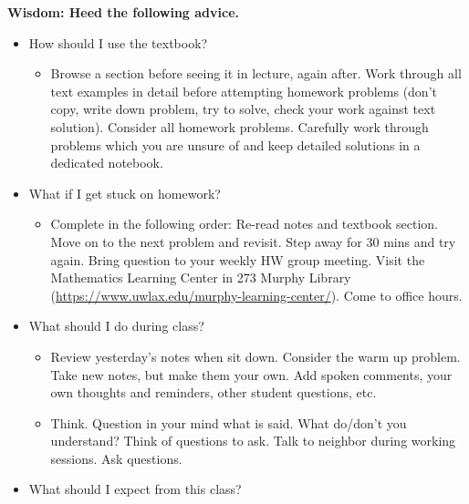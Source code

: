 \documentclass [11pt]{article}
\begin{document}
\bfseries Wisdom: \normalfont Heed the following advice.  \begin{itemize}
\setlength{\itemsep}{1pt}
\setlength{\parskip}{0pt}
\setlength{\parsep}{0pt}
\item How should I use the textbook?  \vspace{-1mm}
\begin {itemize}
\setlength{\itemsep}{1pt}
\setlength{\parskip}{0pt}
\setlength{\parsep}{0pt}
\item Browse a section before seeing it in lecture, again after. Work through all text examples in detail before attempting homework problems (don't copy, write down problem, try to solve, check your work against text solution). Consider all homework problems. Carefully work through problems which you are unsure of and keep detailed solutions in a dedicated notebook.
\end{itemize}
\item What if I get stuck on homework?  \vspace{-1mm}
\begin {itemize}
\setlength{\itemsep}{1pt}
\setlength{\parskip}{0pt}
\setlength{\parsep}{0pt}
\item Complete in the following order: Re-read notes and textbook section. Move on to the next problem and revisit. Step away for 30 mins and try again. Bring question to your weekly HW group meeting. Visit the Mathematics Learning Center in 273 Murphy Library (\url{https://www.uwlax.edu/murphy-learning-center/}). Come to office hours.
\end{itemize}
\item What should I do during class?  \vspace{-1mm}
\begin {itemize}
\setlength{\itemsep}{1pt}
\setlength{\parskip}{0pt}
\setlength{\parsep}{0pt}
\item Review yesterday's notes when sit down. Consider the warm up problem. Take new notes, but make them your own. Add spoken comments, your own thoughts and reminders, other student questions, etc.
\item Think. Question in your mind what is said. What do/don't you understand? Think of questions to ask. Talk to neighbor during working sessions. Ask questions.
\end{itemize}
\item What should I expect from this class? \vspace{-1mm}

\end{itemize}
\end{document}

